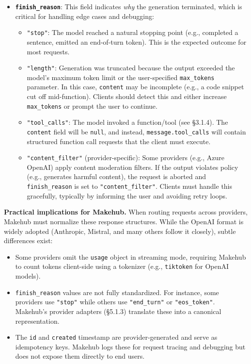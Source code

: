 \documentclass[english]{article}
\begin{document}
\begin{itemize}
    \item \textbf{\texttt{finish\_reason}}: This field indicates \emph{why} the generation terminated, which is critical for handling edge cases and debugging:
    \begin{itemize}
        \item \texttt{"stop"}: The model reached a natural stopping point (e.g., completed a sentence, emitted an end-of-turn token). This is the expected outcome for most requests.
        \item \texttt{"length"}: Generation was truncated because the output exceeded the model's maximum token limit or the user-specified \texttt{max\_tokens} parameter. In this case, \texttt{content} may be incomplete (e.g., a code snippet cut off mid-function). Clients should detect this and either increase \texttt{max\_tokens} or prompt the user to continue.
        \item \texttt{"tool\_calls"}: The model invoked a function/tool (see §3.1.4). The \texttt{content} field will be \texttt{null}, and instead, \texttt{message.tool\_calls} will contain structured function call requests that the client must execute.
        \item \texttt{"content\_filter"} (provider-specific): Some providers (e.g., Azure OpenAI) apply content moderation filters. If the output violates policy (e.g., generates harmful content), the request is aborted and \texttt{finish\_reason} is set to \texttt{"content\_filter"}. Clients must handle this gracefully, typically by informing the user and avoiding retry loops.
    \end{itemize}
\end{itemize}

\medskip

\noindent\textbf{Practical implications for Makehub.}
When routing requests across providers, Makehub must normalize these response structures. While the OpenAI format is widely adopted (Anthropic, Mistral, and many others follow it closely), subtle differences exist:
\begin{itemize}
    \item Some providers omit the \texttt{usage} object in streaming mode, requiring Makehub to count tokens client-side using a tokenizer (e.g., \texttt{tiktoken} for OpenAI models).
    \item \texttt{finish\_reason} values are not fully standardized. For instance, some providers use \texttt{"stop"} while others use \texttt{"end\_turn"} or \texttt{"eos\_token"}. Makehub's provider adapters (§5.1.3) translate these into a canonical representation.
    \item The \texttt{id} and \texttt{created} timestamp are provider-generated and serve as idempotency keys. Makehub logs these for request tracing and debugging but does not expose them directly to end users.
\end{itemize}
\end{document}
